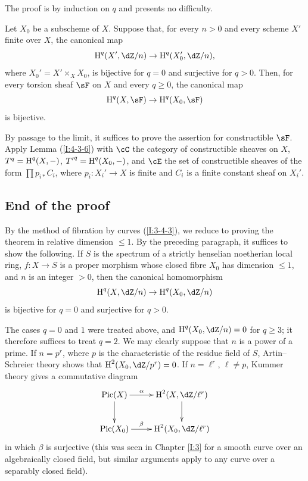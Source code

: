 The proof is by induction on $q$ and presents no difficulty.

\begin{proposition}\label{I:4-3-7}
Let $X_0$ be a subscheme of $X$. Suppose that, for every
$n>0$ and every scheme $X'$ finite over $X$, the canonical map
\[
  \h^q(X',\dZ/n) \to \h^q(X_0',\dZ/n)\text{,}
\]
where $X_0'=X'\times_XX_0$, is bijective for $q=0$ and surjective for
$q>0$. Then, for every torsion sheaf $\sF$ on $X$ and every
$q\geqslant0$, the canonical map
\[
  \h^q(X,\sF) \to \h^q(X_0,\sF)
\]
is bijective.
\end{proposition}

By passage to the limit, it suffices to prove the assertion for
constructible $\sF$. Apply Lemma (\ref{I:4-3-6}) with $\cC$ the category
of constructible sheaves on $X$, $T^q=\operatorname{H}^q(X,-)$,
${T'}^q=\operatorname{H}^q(X_0,-)$, and $\cE$ the set of constructible sheaves of the
form $\prod p_{i*}C_i$, where $p_i:X_i'\to X$ is finite and $C_i$ is a
finite constant sheaf on $X_i'$.

\subsection{End of the proof}\label{I:4-4}

By the method of fibration by curves (\ref{I:3-4-3}), we reduce to proving
the theorem in relative dimension $\leqslant1$. By the preceding
paragraph, it suffices to show the following. If $S$ is the spectrum of a
strictly henselian noetherian local ring, $f:X\to S$ is a proper
morphism whose closed fibre $X_0$ has dimension $\leqslant1$, and $n$
is an integer $>0$, then the canonical homomorphism
\[
  \h^q(X,\dZ/n) \to \h^q(X_0,\dZ/n)
\]
is bijective for $q=0$ and surjective for $q>0$.

The cases $q=0$ and $1$ were treated above, and
$\h^q(X_0,\dZ/n)=0$ for $q\geqslant3$; it therefore suffices to treat
$q=2$. We may clearly suppose that $n$ is a power of a prime. If
$n=p^r$, where $p$ is the characteristic of the residue field of $S$,
Artin--Schreier theory shows that $\h^2(X_0,\dZ/p^r)=0$. If
$n=\ell^r$, $\ell\ne p$, Kummer theory gives a commutative diagram
\[\xymatrix{
  \pic(X) \ar[d] \ar[r]^-\alpha
    & \h^2(X,\dZ/\ell^r) \ar[d] \\
  \pic(X_0) \ar[r]^-\beta
    & \h^2(X_0,\dZ/\ell^r)
}\]
in which $\beta$ is surjective (this was seen in Chapter \ref{I:3} for a
smooth curve over an algebraically closed field, but similar arguments
apply to any curve over a separably closed field).


